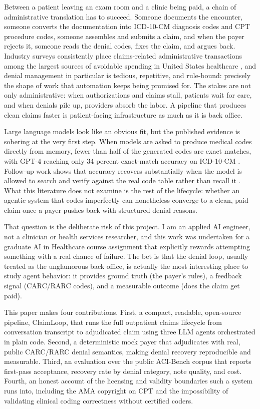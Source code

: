 \documentclass[sigconf,nonacm]{acmart}
\begin{document}
Between a patient leaving an exam room and a clinic being paid, a chain of
administrative translation has to succeed. Someone documents the encounter,
someone converts the documentation into ICD-10-CM diagnosis codes and CPT
procedure codes, someone assembles and submits a claim, and when the payer
rejects it, someone reads the denial codes, fixes the claim, and argues back.
Industry surveys consistently place claims-related administrative transactions
among the largest sources of avoidable spending in United States healthcare
\cite{caqh2023}, and denial management in particular is tedious, repetitive,
and rule-bound: precisely the shape of work that automation keeps being
promised for. The stakes are not only administrative: when authorizations
and claims stall, patients wait for care, and when denials pile up,
providers absorb the labor. A pipeline that produces clean claims faster is
patient-facing infrastructure as much as it is back office.

Large language models look like an obvious fit, but the published evidence is
sobering at the very first step. When models are asked to produce medical
codes directly from memory, fewer than half of the generated codes are exact
matches, with GPT-4 reaching only 34 percent exact-match accuracy on
ICD-10-CM \cite{soroush2024poor}. Follow-up work shows that accuracy recovers
substantially when the model is allowed to search and verify against the real
code table rather than recall it \cite{kwan2024tools}. What this literature
does not examine is the rest of the lifecycle: whether an agentic system that
codes imperfectly can nonetheless converge to a clean, paid claim once a payer
pushes back with structured denial reasons.

That question is the deliberate risk of this project. I am an applied AI
engineer, not a clinician or health services researcher, and this work was
undertaken for a graduate AI in Healthcare course assignment that explicitly
rewards attempting something with a real chance of failure. The bet is that
the denial loop, usually treated as the unglamorous back office, is actually
the most interesting place to study agent behavior: it provides ground truth
(the payer's rules), a feedback signal (CARC/RARC codes), and a measurable
outcome (does the claim get paid).

This paper makes four contributions. First, a compact, readable, open-source
pipeline, ClaimLoop, that runs the full outpatient claims lifecycle from
conversation transcript to adjudicated claim using three LLM agents
orchestrated in plain code. Second, a deterministic mock payer that
adjudicates with real, public CARC/RARC denial semantics, making denial
recovery reproducible and measurable. Third, an evaluation over the public
ACI-Bench corpus that reports first-pass acceptance, recovery rate by denial
category, note quality, and cost. Fourth, an honest account of the licensing
and validity boundaries such a system runs into, including the AMA copyright
on CPT and the impossibility of validating clinical coding correctness
without certified coders.
\end{document}
